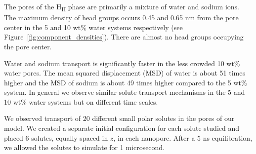 \documentclass{article}
\begin{document}
  The pores of the H\textsubscript{II} phase are primarily a mixture of 
  water and sodium ions. The maximum density of head groups occurs 0.45
  and 0.65 nm from the pore center in the 5 and 10 wt\% water systems 
  respectively (see Figure~\ref{fig:component_densities}). There are 
  almost no head groups occupying the pore center.
  
  Water and sodium transport is significantly faster in the less crowded 
  10 wt\% water pores. The mean squared displacement (MSD) of water is about
  51 times higher and the MSD of sodium is about 49 times higher compared to
  the 5 wt\% system. In general we observe similar solute transport mechanisms
  in the 5 and 10 wt\% water systems but on different time scales.
  
  We observed transport of 20 different small polar solutes in the pores of
  our model. We created a separate initial configuration for each solute 
  studied and placed 6 solutes, equally spaced in $z$, in each nanopore.
  After a 5 ns equilibration, we allowed the solutes to simulate for
  1 microsecond. 
  
\end{document}
